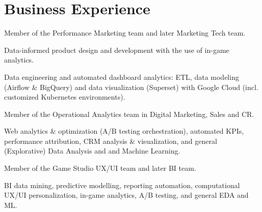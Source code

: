 \documentclass[]{deedy-resume-openfont}
\begin{document}
\hfill
\begin{minipage}[t]{0.66\textwidth} 


\section{Business Experience}
\vspace{\topsep} %
\begin{tightemize}
\item Member of the Performance Marketing team and later Marketing Tech team.
\end{tightemize}

\begin{tightemize}
\item Data-informed product design and development with the use of in-game analytics.
\item Data engineering and automated dashboard analytics: ETL, data modeling (Airflow \& BigQuery) and data visualization (Superset) with Google Cloud (incl. customized Kubernetes environments).
\end{tightemize}

\begin{tightemize}
\item Member of the Operational Analytics team in Digital Marketing, Sales and CR.
\item Web analytics \& optimization (A/B testing orchestration), automated KPIs, performance attribution, CRM analysis \& visualization, and general (Explorative) Data Analysis and and Machine Learning.
\end{tightemize}

\begin{tightemize}
\item Member of the Game Studio UX/UI team and later BI team.
\item BI data mining, predictive modelling, reporting automation, computational UX/UI personalization, in-game analytics, A/B testing, and general EDA and ML.
\end{tightemize}


\end{minipage}
\end{document}
